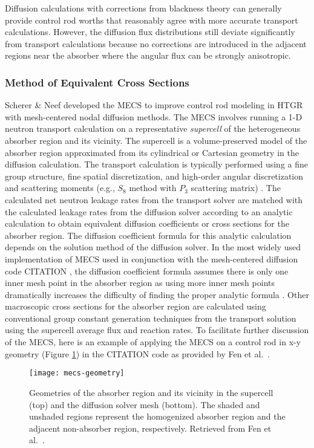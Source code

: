 Diffusion calculations with corrections from blackness theory can generally provide control rod
worths that reasonably agree with more accurate transport calculations. However, the
diffusion flux distributions still deviate significantly from transport calculations because no
corrections are introduced in the adjacent regions near the absorber where the angular flux can be
strongly anisotropic.

\subsubsection{Method of Equivalent Cross Sections}

Scherer \& Neef developed the \gls{MECS} \cite{scherer_determination_1976} to improve control rod
modeling in \gls{HTGR} with mesh-centered nodal diffusion methods. The \gls{MECS} involves running
a 1-D neutron transport calculation on a representative \textit{supercell} of the heterogeneous
absorber region and its vicinity. The supercell is a volume-preserved model of the absorber region
approximated from its cylindrical or Cartesian geometry in the diffusion calculation. The transport
calculation is typically performed using a fine group structure, fine spatial discretization, and
high-order angular discretization and scattering moments (e.g., $S_8$ method with $P_3$ scattering
matrix) \cite{fen_modelling_1992}. The calculated net neutron leakage rates from the transport
solver are matched with the calculated leakage rates from the diffusion solver according to an
analytic calculation to obtain equivalent diffusion coefficients or cross sections for the absorber
region. The diffusion coefficient formula for this analytic calculation depends on the solution
method of the diffusion solver. In the most widely used implementation of \gls{MECS} used in
conjunction with the mesh-centered diffusion code CITATION \cite{teuchert_vsop94_1994}, the
diffusion coefficient formula assumes there is only one inner mesh point in the absorber region as
using more inner mesh points dramatically increases the difficulty of finding the proper analytic
formula \cite{fen_modelling_1992}. Other macroscopic cross sections for the absorber region are
calculated using conventional group constant generation techniques from the transport solution
using the supercell average flux and reaction rates. To facilitate further discussion of the
\gls{MECS}, here is an example of applying the \gls{MECS} on a control rod in x-y geometry (Figure
\ref{fig:mecs-geometry}) in the CITATION code as provided by Fen et al.\ \cite{fen_modelling_1992}.
%
\begin{figure}[htb]
    \centering
    \texttt{[image: mecs-geometry]}
    \caption{Geometries of the absorber region and its vicinity in the supercell
      (top) and the diffusion solver mesh (bottom).
        The shaded and unshaded regions represent the homogenized absorber
        region and the adjacent non-absorber region, respectively.
        Retrieved from Fen et al.\ \cite{fen_modelling_1992}.}
    \label{fig:mecs-geometry}
\end{figure}

